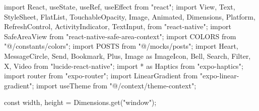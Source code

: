 import React, { useState, useRef, useEffect } from "react";
import {
  View,
  Text,
  StyleSheet,
  FlatList,
  TouchableOpacity,
  Image,
  Animated,
  Dimensions,
  Platform,
  RefreshControl,
  ActivityIndicator,
  TextInput,
} from "react-native";
import { SafeAreaView } from "react-native-safe-area-context";
import { COLORS } from "@/constants/colors";
import { POSTS } from "@/mocks/posts";
import { 
  Heart, 
  MessageCircle, 
  Send, 
  Bookmark, 
  Plus, 
  Image as ImageIcon, 
  Bell,
  Search,
  Filter,
  X,
  Video
} from "lucide-react-native";
import * as Haptics from "expo-haptics";
import { router } from "expo-router";
import { LinearGradient } from "expo-linear-gradient";
import { useTheme } from "@/context/theme-context";

const { width, height } = Dimensions.get("window");

